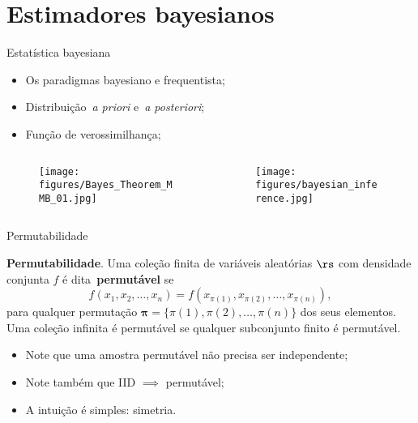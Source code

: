\section*{Estimadores bayesianos}
\begin{frame}{Estatística bayesiana}
 \begin{itemize}
  \item Os paradigmas bayesiano e frequentista; 
  \item Distribuição~\textit{a priori} e~\textit{a posteriori};
  \item Função de verossimilhança;
  \end{itemize}  
  \begin{columns}
    \begin{column}{0.5\textwidth}
        \begin{figure}[!ht]
        \label{fig:bayes_sign}
        \begin{center}
        \texttt{[image: figures/Bayes\_Theorem\_MMB\_01.jpg]} 
        \end{center}
        \end{figure}        
    \end{column}
\begin{column}{0.5\textwidth}
   \begin{figure}[!ht]
    \label{fig:bayes_graph}
    \begin{center}
    \texttt{[image: figures/bayesian\_inference.jpg]} 
    \end{center} 
    \end{figure} 
\end{column}
  \end{columns}  
\end{frame}
\begin{frame}{Permutabilidade}
\begin{defn}[Permutabilidade]
\label{def:exchangeability}
 \textbf{Permutabilidade}.
 Uma coleção finita de variáveis aleatórias $\rs$ com densidade conjunta $f$ é dita~\textbf{permutável} se 
 \[f(x_1, x_2, \ldots, x_n) = f( x_{\pi(1)}, x_{\pi(2)}, \ldots, x_{\pi(n)} ), \]
 para qualquer permutação $\boldsymbol\pi = \{\pi(1), \pi(2), \ldots, \pi(n)\}$ dos seus elementos.
 Uma coleção infinita é permutável se qualquer subconjunto finito é permutável.
\end{defn}
\begin{itemize}
 \item Note que uma amostra permutável não precisa ser independente;
 \item Note também que IID $\implies$ permutável;
 \item A intuição é simples: simetria.
\end{itemize}
\end{frame}
